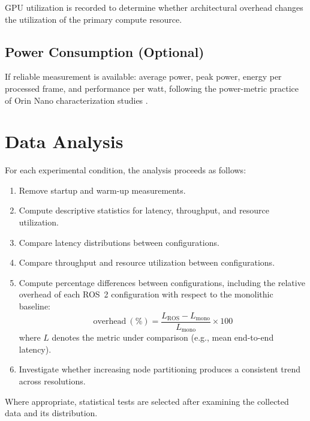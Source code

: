 GPU utilization is recorded to determine whether architectural overhead
changes the utilization of the primary compute resource.

\subsection{Power Consumption (Optional)}

If reliable measurement is available: average power, peak power, energy
per processed frame, and performance per watt, following the
power-metric practice of Orin Nano characterization studies
\cite{zequn2026}.

\section{Data Analysis}
\label{sec:analysis}

For each experimental condition, the analysis proceeds as follows:

\begin{enumerate}
  \item Remove startup and warm-up measurements.
  \item Compute descriptive statistics for latency, throughput, and
        resource utilization.
  \item Compare latency distributions between configurations.
  \item Compare throughput and resource utilization between
        configurations.
  \item Compute percentage differences between configurations, including
        the relative overhead of each ROS~2 configuration with respect to
        the monolithic baseline:
        \begin{equation}
          \mathrm{overhead}\ (\%) = \frac{L_{\mathrm{ROS}} -
          L_{\mathrm{mono}}}{L_{\mathrm{mono}}} \times 100
          \label{eq:overhead}
        \end{equation}
        where $L$ denotes the metric under comparison (e.g., mean
        end-to-end latency).
  \item Investigate whether increasing node partitioning produces a
        consistent trend across resolutions.
\end{enumerate}

Where appropriate, statistical tests are selected after examining the
collected data and its distribution.

